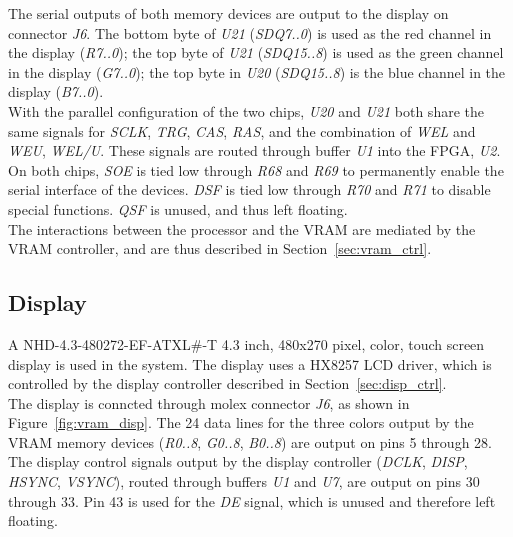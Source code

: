 \documentclass{scrartcl}
\begin{document}
	The serial outputs of both memory devices are output to the display on connector \textit{J6}. The bottom byte of \textit{U21} (\textit{SDQ7..0}) is used as the red channel in the display (\textit{R7..0}); the top byte of \textit{U21} (\textit{SDQ15..8}) is used as the green channel in the display (\textit{G7..0}); the top byte in \textit{U20} (\textit{SDQ15..8}) is the blue channel in the display (\textit{B7..0}).\\

	With the parallel configuration of the two chips, \textit{U20} and \textit{U21} both share the same signals for \textit{SCLK}, \textit{TRG}, \textit{CAS}, \textit{RAS}, and the combination of \textit{WEL} and \textit{WEU}, \textit{WEL/U}. These signals are routed through buffer \textit{U1} into the FPGA, \textit{U2}.\\

	On both chips, \textit{SOE} is tied low through \textit{R68} and \textit{R69} to permanently enable the serial interface of the devices. \textit{DSF} is tied low through \textit{R70} and \textit{R71} to disable special functions. \textit{QSF} is unused, and thus left floating.\\

	The interactions between the processor and the VRAM are mediated by the VRAM controller, and are thus described in Section~\ref{sec:vram_ctrl}.\\

	\subsection{Display}
	A NHD-4.3-480272-EF-ATXL#-T 4.3 inch, 480x270 pixel, color, touch screen display is used in the system. The display uses a HX8257 LCD driver, which is controlled by the display controller described in Section~\ref{sec:disp_ctrl}.\\

	The display is conncted through molex connector \textit{J6}, as shown in Figure~\ref{fig:vram_disp}. The 24 data lines for the three colors output by the VRAM memory devices (\textit{R0..8}, \textit{G0..8}, \textit{B0..8}) are output on pins 5 through 28. The display control signals output by the display controller (\textit{DCLK}, \textit{DISP}, \textit{HSYNC}, \textit{VSYNC}), routed through buffers \textit{U1} and \textit{U7}, are output on pins 30 through 33. Pin 43 is used for the \textit{DE} signal, which is unused and therefore left floating.\\
\end{document}
